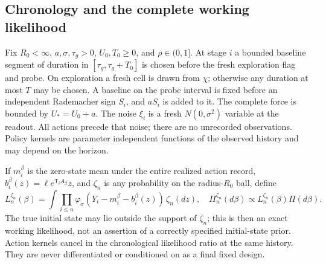 \subsection{Chronology and the complete working likelihood}
Fix $R_0<\infty$, $a,\sigma,\tau_g>0$, $U_0,T_0\ge0$, and $\rho\in(0,1]$.
At stage $i$ a bounded baseline segment of duration in
$[\tau_g,\tau_g+T_0]$ is chosen before the fresh exploration flag and probe.
On exploration a fresh cell is drawn from $\chi$; otherwise any duration at
most $T$ may be chosen. A baseline on the probe interval is fixed before
an independent Rademacher sign $S_i$, and $aS_i$ is added to it.
The complete force is bounded by $U_*=U_0+a$. The noise $\xi_i$ is a fresh
$N(0,\sigma^2)$ variable at the readout. All actions precede that noise;
there are no unrecorded observations. Policy kernels are parameter independent
functions of the observed history and may depend on the horizon.

If $m_i^\beta$ is the zero-state mean under the entire realized action record,
$b_i^\beta(z)=\ell e^{\mathsf T_iA_\beta}z$, and $\zeta_n$ is any probability
on the radius-$R_0$ ball, define
\begin{equation}
 L_n^{\zeta_n}(\beta)=\int\prod_{i\le n}
 \varphi_\sigma(Y_i-m_i^\beta-b_i^\beta(z))\,\zeta_n(dz),\quad
 \Pi_n^{\zeta_n}(d\beta)\propto L_n^{\zeta_n}(\beta)\Pi(d\beta).
 \label{eq:posterior}
\end{equation}
The true initial state may lie outside the support of $\zeta_n$; this is then
an exact working likelihood, not an assertion of a correctly specified
initial-state prior. Action kernels cancel in the chronological likelihood
ratio at the same history. They are never differentiated or conditioned on
as a final fixed design.

